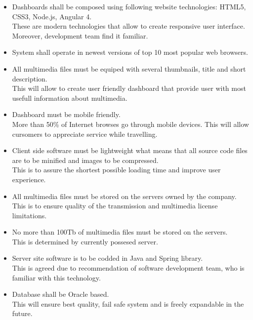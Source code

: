 \documentclass{scrreprt}
\begin{document}
\begin{itemize}
\item Dashboards shall be composed using following website technologies: HTML5, CSS3, Node.js, Angular 4.
\\These are modern technologies that allow to create responsive user interface. Moreover, development team find it familiar.

\item System shall operate in newest versions of top 10 most popular web browsers.

\item All multimedia files must be equiped with several thumbnails, title and short description.
\\This will allow to create user friendly dashboard that provide user with most usefull information about multimedia.

\item Dashboard must be mobile friendly.
\\More than 50\% of Internet browses go through mobile devices. This will allow cursomers to appreciate service while travelling.

\item Client side software must be lightweight what means that all source code files are to be minified and images to be compressed.
\\This is to assure the shortest possible loading time and improve user experience.

\item All multimedia files must be stored on the servers owned by the company.
\\This is to ensure quality of the transmission and multimedia license limitations.

\item No more than 100Tb of multimedia files must be stored on the servers.
\\This is determined by currently possesed server.

\item Server site software is to be codded in Java and Spring library.
\\This is agreed due to recommendation of software development team, who is familiar with this technology.

\item Database shall be Oracle based.
\\This will ensure best quality, fail safe system and is freely expandable in the future.


\end{itemize}
\end{document}
